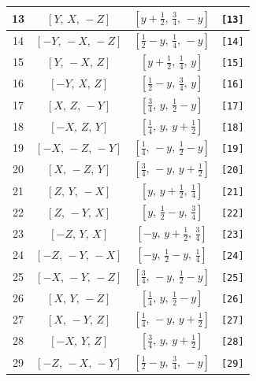 \documentclass[fleqn,8pt]{jsarticle}
\begin{document}
\begin{longtable}{cccc}
13 & $\left[ Y,\, X,\, - Z \right]$ & $\left[ y + \frac{1}{2},\, \frac{3}{4},\, - y \right]$ & {\tt [13]} \\ \hline
14 & $\left[ - Y,\, - X,\, - Z \right]$ & $\left[ \frac{1}{2} - y,\, \frac{1}{4},\, - y \right]$ & {\tt [14]} \\ \hline
15 & $\left[ Y,\, - X,\, Z \right]$ & $\left[ y + \frac{1}{2},\, \frac{1}{4},\, y \right]$ & {\tt [15]} \\ \hline
16 & $\left[ - Y,\, X,\, Z \right]$ & $\left[ \frac{1}{2} - y,\, \frac{3}{4},\, y \right]$ & {\tt [16]} \\ \hline
17 & $\left[ X,\, Z,\, - Y \right]$ & $\left[ \frac{3}{4},\, y,\, \frac{1}{2} - y \right]$ & {\tt [17]} \\ \hline
18 & $\left[ - X,\, Z,\, Y \right]$ & $\left[ \frac{1}{4},\, y,\, y + \frac{1}{2} \right]$ & {\tt [18]} \\ \hline
19 & $\left[ - X,\, - Z,\, - Y \right]$ & $\left[ \frac{1}{4},\, - y,\, \frac{1}{2} - y \right]$ & {\tt [19]} \\ \hline
20 & $\left[ X,\, - Z,\, Y \right]$ & $\left[ \frac{3}{4},\, - y,\, y + \frac{1}{2} \right]$ & {\tt [20]} \\ \hline
21 & $\left[ Z,\, Y,\, - X \right]$ & $\left[ y,\, y + \frac{1}{2},\, \frac{1}{4} \right]$ & {\tt [21]} \\ \hline
22 & $\left[ Z,\, - Y,\, X \right]$ & $\left[ y,\, \frac{1}{2} - y,\, \frac{3}{4} \right]$ & {\tt [22]} \\ \hline
23 & $\left[ - Z,\, Y,\, X \right]$ & $\left[ - y,\, y + \frac{1}{2},\, \frac{3}{4} \right]$ & {\tt [23]} \\ \hline
24 & $\left[ - Z,\, - Y,\, - X \right]$ & $\left[ - y,\, \frac{1}{2} - y,\, \frac{1}{4} \right]$ & {\tt [24]} \\ \hline
25 & $\left[ - X,\, - Y,\, - Z \right]$ & $\left[ \frac{3}{4},\, - y,\, \frac{1}{2} - y \right]$ & {\tt [25]} \\ \hline
26 & $\left[ X,\, Y,\, - Z \right]$ & $\left[ \frac{1}{4},\, y,\, \frac{1}{2} - y \right]$ & {\tt [26]} \\ \hline
27 & $\left[ X,\, - Y,\, Z \right]$ & $\left[ \frac{1}{4},\, - y,\, y + \frac{1}{2} \right]$ & {\tt [27]} \\ \hline
28 & $\left[ - X,\, Y,\, Z \right]$ & $\left[ \frac{3}{4},\, y,\, y + \frac{1}{2} \right]$ & {\tt [28]} \\ \hline
29 & $\left[ - Z,\, - X,\, - Y \right]$ & $\left[ \frac{1}{2} - y,\, \frac{3}{4},\, - y \right]$ & {\tt [29]} \\ \hline

\end{longtable}
\end{document}
